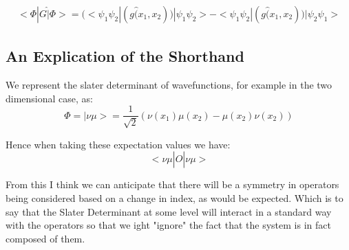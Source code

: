 \documentclass[11pt]{article} %
\begin{document}
\begin{equation}
\begin{split}
<\Phi|G\hat|\Phi>=(<\psi_1 \psi_2|(g\hat(x_1,x_2))|\psi_1\psi_2>-<\psi_1\psi_2|(g\hat(x_1,x_2))|\psi_2\psi_1>
\end{split}
\end{equation}

\subsection{An Explication of the Shorthand}

We represent the slater determinant of wavefunctions, for example in the two dimensional case, as:\\

\begin{equation}
\Phi=|\nu \mu>=\frac{1}{\sqrt{2}}(\nu(x_1)\mu(x_2)-\mu(x_2)\nu(x_2))
\end{equation}

Hence when taking these expectation values we have:\\
\begin{equation}
<\nu \mu|\hat{O}|\nu \mu >
\end{equation}

From this I think we can anticipate that there will be a symmetry in operators being considered based on a change in index, as would be expected. Which is to say that the Slater Determinant at some level will interact in a standard way with the operators so that we ight "ignore" the fact that the system is in fact composed of them.
\end{document}
